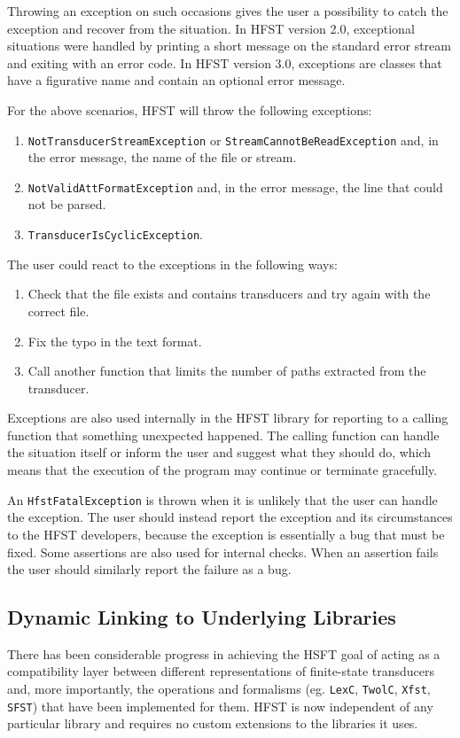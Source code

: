 \documentclass{llncs}
\begin{document}
Throwing an exception on such occasions gives the user a possibility
to catch the exception and recover from the situation. In HFST version
2.0, exceptional situations were handled by printing a short message
on the standard error stream and exiting with an error code. In HFST version 3.0, 
exceptions are classes that have a figurative name and contain an 
optional error message.

For the above scenarios, HFST will throw the following exceptions:

\begin{enumerate} 
\item \texttt{NotTransducerStreamException} or 
\texttt{StreamCannotBeReadException} and, in the error message,
the name of the file or stream.
\item \texttt{NotValidAttFormatException} and, in the error message, 
the line that could not be parsed.
\item \texttt{TransducerIsCyclicException}.
\end{enumerate} 

The user could react to the exceptions in the following ways:

\begin{enumerate} 
\item Check that the file exists and contains transducers and try again
with the correct file.
\item Fix the typo in the text format.
\item Call another function that limits the number of paths extracted
from the transducer.
\end{enumerate} 

Exceptions are also used internally in the HFST library for reporting to a 
calling function that something unexpected happened. The calling
function can handle the situation itself or inform the user and suggest
what they should do, which means that the execution of the program 
may continue or terminate gracefully.

An \texttt{HfstFatalException} is thrown when it is unlikely that the user
can handle the exception. The user should instead report the exception
and its circumstances to the HFST developers, because the exception
is essentially a bug that must be fixed. Some assertions are also
used for internal checks. When an assertion fails the user should similarly
report the failure as a bug.

\subsection{Dynamic Linking to Underlying Libraries}
There has been considerable progress in achieving the HSFT goal of acting as a
compatibility layer between different representations of finite-state
transducers and, more importantly, the operations and formalisms (eg.
\verb+LexC+, \verb+TwolC+, \verb+Xfst+, \verb+SFST+) that have been implemented
for them. HFST is now independent of any particular library and requires no
custom extensions to the libraries it uses.
\end{document}
